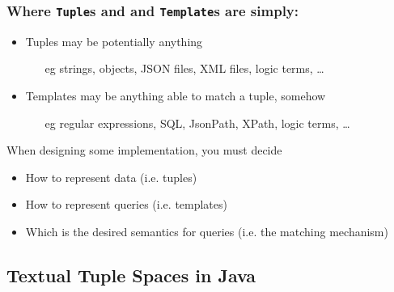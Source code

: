 \documentclass[presentation]{beamer}\mode<presentation>{\usetheme{AMSCesenaPurpleAndGold}}
\begin{document}
\begin{frame}%
\frametitle{Where \texttt{Tuple}s and and \texttt{Template}s are simply:}

	\columsHH{
		
	}{
		
	}

	\begin{itemize}
		\item Tuples may be potentially anything
		\begin{itemize}
			\item[eg] strings, objects, JSON files, XML files, logic terms, \ldots
		\end{itemize}

		\item Templates may be anything able to match a tuple, somehow
		\begin{itemize}
			\item[eg] regular expressions, SQL, JsonPath, XPath, logic terms, \ldots
		\end{itemize}
	\end{itemize}

	\vfill

	\begin{block}{When designing some \linda{} implementation, you must decide}
		\begin{itemize}
			\item How to represent data (i.e. \alert{tuples})
			\item How to represent queries (i.e. \alert{templates})
			\item Which is the desired semantics for queries (i.e. the \alert{matching} mechanism)
		\end{itemize}
	\end{block}

\end{frame}

\subsection{Textual Tuple Spaces in Java}
\end{document}
